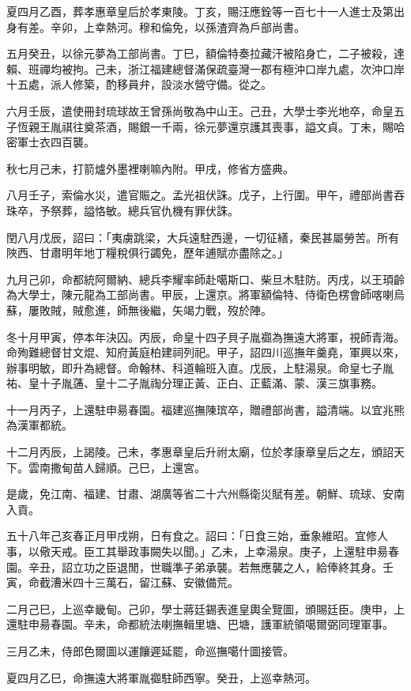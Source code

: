 \begin{pinyinscope}
夏四月乙酉，葬孝惠章皇后於孝東陵。丁亥，賜汪應銓等一百七十一人進士及第出身有差。辛卯，上幸熱河。穆和倫免，以孫渣齊為戶部尚書。

五月癸丑，以徐元夢為工部尚書。丁巳，額倫特奏拉藏汗被陷身亡，二子被殺，達賴、班禪均被拘。己未，浙江福建總督滿保疏臺灣一郡有極沖口岸九處，次沖口岸十五處，派人修築，酌移員弁，設淡水營守備。從之。

六月壬辰，遣使冊封琉球故王曾孫尚敬為中山王。己丑，大學士李光地卒，命皇五子恆親王胤祺往奠茶酒，賜銀一千兩，徐元夢還京護其喪事，謚文貞。丁未，賜哈密軍士衣四百襲。

秋七月己未，打箭爐外墨裡喇嘛內附。甲戌，修省方盛典。

八月壬子，索倫水災，遣官賑之。孟光祖伏誅。戊子，上行圍。甲午，禮部尚書吞珠卒，予祭葬，謚恪敏。總兵官仇機有罪伏誅。

閏八月戊辰，詔曰：「夷虜跳梁，大兵遠駐西邊，一切征繕，秦民甚屬勞苦。所有陜西、甘肅明年地丁糧稅俱行蠲免，歷年逋賦亦盡除之。」

九月己卯，命都統阿爾納、總兵李耀率師赴噶斯口、柴旦木駐防。丙戌，以王頊齡為大學士，陳元龍為工部尚書。甲辰，上還京。將軍額倫特、侍衛色楞會師喀喇烏蘇，屢敗賊，賊愈進，師無後繼，矢竭力戰，歿於陣。

冬十月甲寅，停本年決囚。丙辰，命皇十四子貝子胤禵為撫遠大將軍，視師青海。命殉難總督甘文焜、知府黃庭柏建祠列祀。甲子，詔四川巡撫年羹堯，軍興以來，辦事明敏，即升為總督。命翰林、科道輪班入直。戊辰，上駐湯泉。命皇七子胤祐、皇十子胤蓪、皇十二子胤祹分理正黃、正白、正藍滿、蒙、漢三旗事務。

十一月丙子，上還駐申昜春園。福建巡撫陳瑸卒，贈禮部尚書，謚清端。以宜兆熊為漢軍都統。

十二月丙辰，上謁陵。己未，孝惠章皇后升祔太廟，位於孝康章皇后之左，頒詔天下。雲南撒甸苗人歸順。己巳，上還宮。

是歲，免江南、福建、甘肅、湖廣等省二十六州縣衛災賦有差。朝鮮、琉球、安南入貢。

五十八年己亥春正月甲戌朔，日有食之。詔曰：「日食三始，垂象維昭。宜修人事，以儆天戒。臣工其舉政事闕失以聞。」乙未，上幸湯泉。庚子，上還駐申昜春園。辛丑，詔立功之臣退閒，世職準子弟承襲。若無應襲之人，給俸終其身。壬寅，命截漕米四十三萬石，留江蘇、安徽備荒。

二月己巳，上巡幸畿甸。己卯，學士蔣廷錫表進皇輿全覽圖，頒賜廷臣。庚申，上還駐申昜春園。辛未，命都統法喇撫輯里塘、巴塘，護軍統領噶爾弼同理軍事。

三月乙未，侍郎色爾圖以運饟遲延罷，命巡撫噶什圖接管。

夏四月乙巳，命撫遠大將軍胤禵駐師西寧。癸丑，上巡幸熱河。


\end{pinyinscope}
